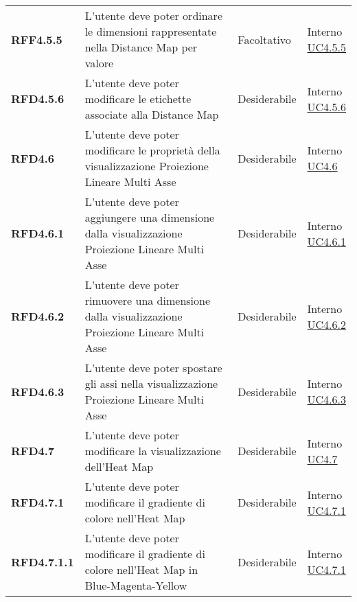 \begin{longtable}[H]{| >{\raggedright\bfseries}m{20mm} | >{\raggedright}m{90mm} | >{\centering}m{25mm} | >{\centering\arraybackslash}m{30mm}|}
    RFF4.5.5
    & L'utente deve poter ordinare le dimensioni rappresentate nella Distance Map per valore
    & Facoltativo
    & \makecell{ Interno \\ \hyperref[par:uc4.5.5]{UC4.5.5} }\\

    RFD4.5.6
    & L'utente deve poter modificare le etichette associate alla Distance Map
    & Desiderabile
    & \makecell{ Interno \\ \hyperref[par:uc4.5.6]{UC4.5.6} }\\

    RFD4.6
    & L'utente deve poter modificare le proprietà della visualizzazione Proiezione Lineare Multi Asse
    & Desiderabile
    & \makecell{ Interno \\  \hyperref[ssub:uc4.6]{UC4.6} }\\

    RFD4.6.1
    & L'utente deve poter aggiungere una dimensione dalla visualizzazione Proiezione Lineare Multi Asse
    & Desiderabile
    & \makecell{ Interno \\  \hyperref[par:uc4.6.1]{UC4.6.1} }\\

    RFD4.6.2
    & L'utente deve poter rimuovere una dimensione dalla visualizzazione Proiezione Lineare Multi Asse
    & Desiderabile
    & \makecell{ Interno \\  \hyperref[par:uc4.6.2]{UC4.6.2} }\\

    RFD4.6.3
    & L'utente deve poter spostare gli assi nella visualizzazione Proiezione Lineare Multi Asse
    & Desiderabile
    & \makecell{ Interno \\  \hyperref[par:uc4.6.3]{UC4.6.3} }\\

    RFD4.7
    & L'utente deve poter modificare la visualizzazione dell'Heat Map
    & Desiderabile
    & \makecell{ Interno \\  \hyperref[ssub:uc4.7]{UC4.7} }\\

    RFD4.7.1
    & L'utente deve poter modificare il gradiente di colore nell'Heat Map
    & Desiderabile
    & \makecell{ Interno \\  \hyperref[par:uc4.7.1]{UC4.7.1} }\\

    RFD4.7.1.1
    & L'utente deve poter modificare il gradiente di colore nell'Heat Map in Blue-Magenta-Yellow
    & Desiderabile
    & \makecell{ Interno \\  \hyperref[par:uc4.7.1]{UC4.7.1} }\\


\end{longtable}
